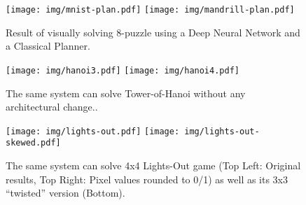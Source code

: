 \documentclass[letterpaper,11pt]{article}
\begin{document}
% 
% 
% 

\begin{figure}[h]
 \centering
 \texttt{[image: img/mnist-plan.pdf]}
 \texttt{[image: img/mandrill-plan.pdf]}
 \caption{Result of visually solving 8-puzzle using a Deep Neural Network and a Classical Planner. \cite{Asai2017c}}
\end{figure}


\begin{figure}[h]
 \centering
 \texttt{[image: img/hanoi3.pdf]}
 \texttt{[image: img/hanoi4.pdf]}
 \caption{The same system can solve Tower-of-Hanoi without any architectural change..}
\end{figure}

\begin{figure}[h]
 \centering
 \texttt{[image: img/lights-out.pdf]}
 \texttt{[image: img/lights-out-skewed.pdf]}
 \caption{The same system can solve 4x4 Lights-Out game (Top Left: Original results, Top Right: Pixel values rounded to 0/1)
as well as its 3x3 ``twisted'' version (Bottom).}
\end{figure}
\end{document}
